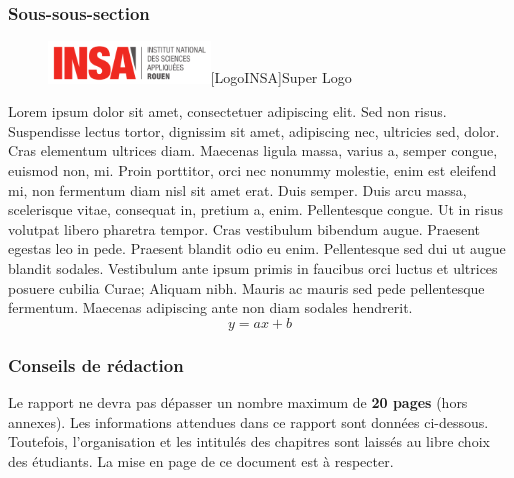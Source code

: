 \documentclass[a4paper, 12pt]{report} %
\begin{document}
				\subsubsection{Sous-sous-section}


\begin{figure}[h]
\centering
\vspace{-0.6cm} 
\includegraphics[width=43mm]{images/insalogo2.png}[LogoINSA]{Super Logo}
\end{figure}



	Lorem ipsum dolor sit amet, consectetuer adipiscing elit. Sed non risus. Suspendisse lectus tortor, dignissim sit amet, adipiscing nec, ultricies sed, dolor. Cras elementum ultrices diam. Maecenas ligula massa, varius a, semper congue, euismod non, mi. Proin porttitor, orci nec nonummy molestie, enim est eleifend mi, non fermentum diam nisl sit amet erat. Duis semper. Duis arcu massa, scelerisque vitae, consequat in, pretium a, enim. Pellentesque congue. Ut in risus volutpat libero pharetra tempor. Cras vestibulum bibendum augue. Praesent egestas leo in pede. Praesent blandit odio eu enim. Pellentesque sed dui ut augue blandit sodales. Vestibulum ante ipsum primis in faucibus orci luctus et ultrices posuere cubilia Curae; Aliquam nibh. Mauris ac mauris sed pede pellentesque fermentum. Maecenas adipiscing ante non diam sodales hendrerit.\\

\begin{equation}
	y = a x + b
\end{equation}

				\subsubsection{Conseils de rédaction}

	Le rapport ne devra pas dépasser un nombre maximum de \textbf{20 pages} (hors annexes). Les informations attendues dans ce rapport sont données ci-dessous. Toutefois, l’organisation et les intitulés des chapitres sont laissés au libre choix des étudiants. La mise en page de ce document est à respecter. 
\end{document}
